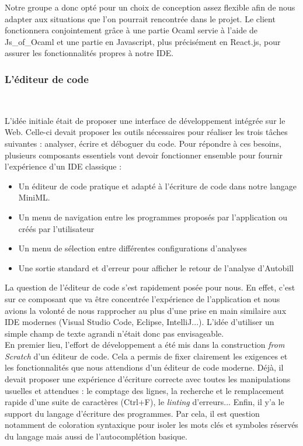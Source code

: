 \documentclass[12pt]{article}
\begin{document}
Notre groupe a donc opté pour un choix de conception assez flexible afin de nous adapter aux situations que l'on pourrait rencontrée dans le projet. Le client fonctionnera conjointement grâce à une partie Ocaml servie à l'aide de Js\_of\_Ocaml et une partie en Javascript, plus précisément en React.js, pour assurer les fonctionnalités propres à notre IDE.

\subsubsection{L'éditeur de code}\

L'idée initiale était de proposer une interface de développement intégrée sur le Web. Celle-ci devait proposer les outils nécessaires pour réaliser les trois tâches suivantes : analyser, écrire et déboguer du code. Pour répondre à ces besoins, plusieurs composants essentiels vont devoir fonctionner ensemble pour fournir l'expérience d'un IDE classique :
\begin{itemize}
    \item Un éditeur de code pratique et adapté à l'écriture de code dans notre langage MiniML.
    \item Un menu de navigation entre les programmes proposés par l'application ou créés par l'utilisateur
    \item Un menu de sélection entre différentes configurations d'analyses
    \item Une sortie standard et d'erreur pour afficher le retour de l'analyse d'Autobill \\ 
\end{itemize} 

La question de l'éditeur de code s'est rapidement posée pour nous. En effet, c'est sur ce composant que va être concentrée l'expérience de l'application et nous avions la volonté de nous rapprocher au plus d'une prise en main similaire aux IDE modernes (Visual Studio Code, Eclipse, IntelliJ...). L'idée d'utiliser un simple champ de texte agrandi n'était donc pas envisageable. \\ 

En premier lieu, l'effort de développement a été mis dans la construction \textit{from Scratch} d'un éditeur de code. Cela a permis de fixer clairement les exigences et les fonctionnalités que nous attendions d'un éditeur de code moderne. Déjà, il devait proposer une expérience d'écriture correcte avec toutes les manipulations usuelles et attendues : le comptage des lignes, la recherche et le remplacement rapide d'une suite de caractères (Ctrl+F), le \textit{linting} d'erreurs... Enfin, il y'a le support du langage d'écriture des programmes. Par cela, il est question notamment de coloration syntaxique pour isoler les mots clés et symboles réservés du langage mais aussi de l'autocomplétion basique.  \\ 
\end{document}
